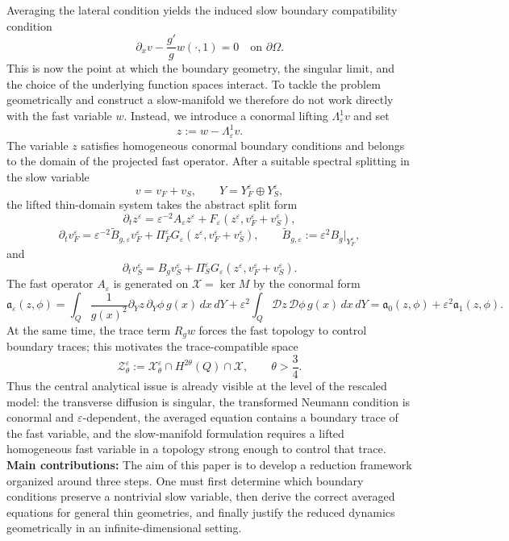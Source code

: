 \documentclass[11pt]{article}
\theoremstyle{definition}
\theoremstyle{remark}
\numberwithin{equation}{section}
\newcommand{\mc}[1]{\mathcal{#1}}
\begin{document}
Averaging the lateral condition yields the induced slow boundary compatibility condition 
\[ \partial_xv-\frac{g'}g w(\cdot,1)=0 \quad \text{on } \partial\Omega . \] 
This is now the point at which the boundary geometry, the singular limit, and the choice of the underlying function spaces interact. To tackle the problem geometrically and construct a slow-manifold we therefore do not work directly with the fast variable \(w\). Instead, we introduce a conormal lifting \(\Lambda_\varepsilon^1 v\) and set 
\[ z:=w-\Lambda_\varepsilon^1v . \]
The variable \(z\) satisfies homogeneous conormal boundary conditions and belongs to the domain of the projected fast operator. 
After a suitable spectral splitting in the slow variable
\[ v=v_F+v_S,\qquad Y=Y_F^\varepsilon\oplus Y_S^\varepsilon, \]
the lifted thin-domain system takes the abstract split form 
\[ \partial_t z^\varepsilon = \varepsilon^{-2}A_\varepsilon z^\varepsilon + F_\varepsilon(z^\varepsilon,v_F^\varepsilon+v_S^\varepsilon), \]
\[ \partial_t v_F^\varepsilon = \varepsilon^{-2}\widetilde B_{g,\varepsilon}v_F^\varepsilon + \Pi_F^\varepsilon G_\varepsilon(z^\varepsilon,v_F^\varepsilon+v_S^\varepsilon), \qquad \widetilde B_{g,\varepsilon}:=\varepsilon^2 B_g|_{Y_F^\varepsilon}, \] 
and 
\[ \partial_t v_S^\varepsilon = B_gv_S^\varepsilon + \Pi_S^\varepsilon G_\varepsilon(z^\varepsilon,v_F^\varepsilon+v_S^\varepsilon). \]
The fast operator \(A_\varepsilon\) is generated on \(\mc X=\ker M\) by the conormal form 
\[ \mathfrak a_\varepsilon(z,\phi) = \int_Q \frac1{g(x)^2}\partial_Yz\,\partial_Y\phi\,g(x)\,dx\,dY + \varepsilon^2 \int_Q \mc Dz\,\mc D\phi\,g(x)\,dx\,dY = \mathfrak a_0(z,\phi)+\varepsilon^2 \mathfrak a_1(z,\phi). \]
At the same time, the trace term \(R_gw\) forces the fast topology to control boundary traces; this motivates the trace-compatible space 
\[ \mc Z_\theta^\varepsilon := \mc X_\theta^\varepsilon\cap H^{2\theta}(Q)\cap \mc X, \qquad \theta>\frac34 . \]
Thus the central analytical issue is already visible at the level of the rescaled model: the transverse diffusion is singular, the transformed Neumann condition is conormal and \(\varepsilon\)-dependent, the averaged equation contains a boundary trace of the fast variable, and the slow-manifold formulation requires a lifted homogeneous fast variable in a topology strong enough to control that trace.\\

\textbf{Main contributions:} The aim of this paper is to develop a reduction framework organized around three steps. One must first determine which boundary conditions preserve a nontrivial slow variable, then derive the correct averaged equations for general thin geometries, and finally justify the reduced dynamics geometrically in an infinite-dimensional setting.
\end{document}
